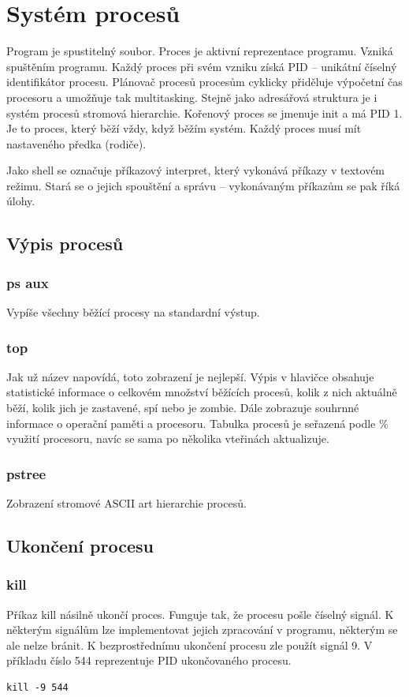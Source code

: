\documentclass{article}
\begin{document}
\section{Systém procesů}
Program je spustitelný soubor. Proces je aktivní reprezentace programu. Vzniká spuštěním programu. Každý proces při svém vzniku získá PID -- unikátní číselný identifikátor procesu. Plánovač procesů procesům cyklicky přiděluje výpočetní čas procesoru a umožňuje tak multitasking. Stejně jako adresářová struktura je i systém procesů stromová hierarchie. Kořenový proces se jmenuje init a má PID 1. Je to proces, který běží vždy, když běžím systém. Každý proces musí mít nastaveného předka (rodiče).

Jako shell se označuje příkazový interpret, který vykonává příkazy v textovém režimu. Stará se o jejich spouštění a správu -- vykonávaným příkazům se pak říká úlohy.

\subsection{Výpis procesů}
\subsubsection{ps aux}
Vypíše všechny běžící procesy na standardní výstup. 
\subsubsection{top}
Jak už název napovídá, toto zobrazení je nejlepší. Výpis v hlavičce obsahuje statistické informace o celkovém množství běžících procesů, kolik z nich aktuálně běží, kolik jich je zastavené, spí nebo je zombie. Dále zobrazuje souhrnné informace o operační paměti a procesoru. Tabulka procesů je seřazená podle \% využití procesoru, navíc se sama po několika vteřinách aktualizuje.
\subsubsection{pstree}
Zobrazení stromové ASCII art hierarchie procesů.

\subsection{Ukončení procesu}
\subsubsection{kill}
Příkaz kill násilně ukončí proces. Funguje tak, že procesu pošle číselný signál. K některým signálům lze implementovat jejich zpracování v programu, některým se ale nelze bránit. K bezprostřednímu ukončení procesu zle použít signál 9. V příkladu číslo 544 reprezentuje PID ukončovaného procesu.
\begin{verbatim}
kill -9 544 
\end{verbatim}
\end{document}
